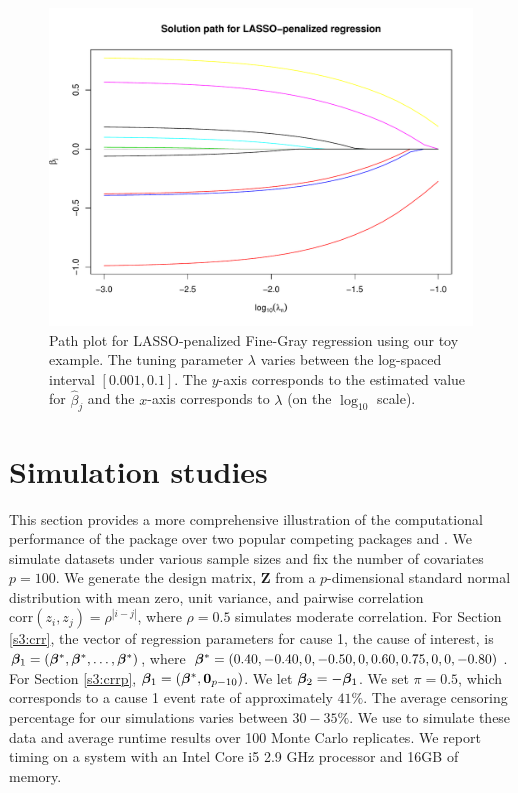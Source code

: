 \begin{figure}[t!]
\label{fig2:lasso}
\centering
\includegraphics[scale = 0.6]{plots/new_LASSO-eps-converted-to.pdf}
\caption{Path plot for LASSO-penalized Fine-Gray regression using our toy example. The tuning parameter $\lambda$ varies between the log-spaced interval $[0.001, 0.1]$. The $y$-axis corresponds to the estimated value for $\hat{\beta}_j$ and the $x$-axis corresponds to $\lambda$ (on the $\log_{10}$ scale).}
\end{figure}

\section{Simulation studies}
\label{s3:sim}
This section provides a more comprehensive illustration of the computational performance of the  package over two popular competing packages  and . 
We simulate datasets under various sample sizes and fix the number of covariates $p = 100$. We generate the design matrix, $\mathbf{Z}$
from a $p$-dimensional standard normal distribution with mean zero, unit variance, and pairwise correlation $\mbox{corr}(z_i, z_j) = \rho^{|i-j|}$, where $\rho = 0.5$ simulates moderate correlation. For Section \ref{s3:crr}, the vector of regression parameters for cause 1, the cause of interest, is $\bm \beta_1 = (\bm \beta^*, \bm \beta^*, \ldots, \bm \beta^*)$, where  $\bm \beta^* = (0.40, -0.40, 0, -0.50, 0, 0.60, 0.75, 0, 0, -0.80)$. For Section \ref{s3:crrp}, $\bm \beta_1 = (\bm \beta^*, \mathbf{0}_{p - 10})$. We let $\bm \beta_2 = -\bm \beta_1$. We set $\pi =  0.5$, which corresponds to a cause 1 event rate of approximately $41\%$.  The average censoring percentage for our simulations varies between $30-35\%$.  We use   to simulate these data and average runtime results over 100 Monte Carlo replicates. We report timing on a system with an Intel Core i5 2.9 GHz processor and 16GB of memory.

